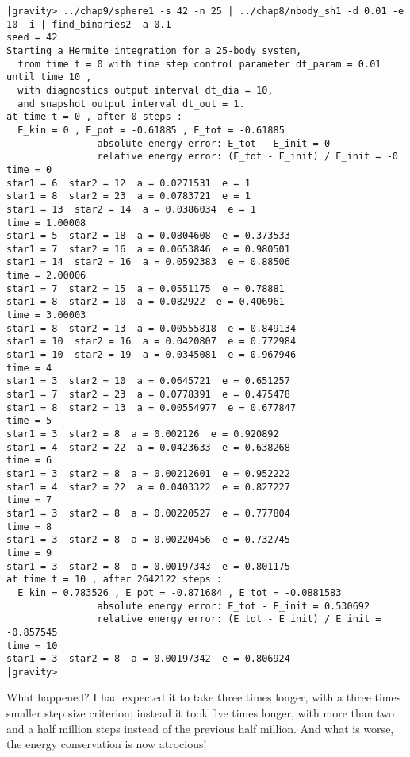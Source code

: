 \begin{small}
\begin{verbatim}
|gravity> ../chap9/sphere1 -s 42 -n 25 | ../chap8/nbody_sh1 -d 0.01 -e 10 -i | find_binaries2 -a 0.1
seed = 42
Starting a Hermite integration for a 25-body system,
  from time t = 0 with time step control parameter dt_param = 0.01  until time 10 ,
  with diagnostics output interval dt_dia = 10,
  and snapshot output interval dt_out = 1.
at time t = 0 , after 0 steps :
  E_kin = 0 , E_pot = -0.61885 , E_tot = -0.61885
                absolute energy error: E_tot - E_init = 0
                relative energy error: (E_tot - E_init) / E_init = -0
time = 0
star1 = 6  star2 = 12  a = 0.0271531  e = 1
star1 = 8  star2 = 23  a = 0.0783721  e = 1
star1 = 13  star2 = 14  a = 0.0386034  e = 1
time = 1.00008
star1 = 5  star2 = 18  a = 0.0804608  e = 0.373533
star1 = 7  star2 = 16  a = 0.0653846  e = 0.980501
star1 = 14  star2 = 16  a = 0.0592383  e = 0.88506
time = 2.00006
star1 = 7  star2 = 15  a = 0.0551175  e = 0.78881
star1 = 8  star2 = 10  a = 0.082922  e = 0.406961
time = 3.00003
star1 = 8  star2 = 13  a = 0.00555818  e = 0.849134
star1 = 10  star2 = 16  a = 0.0420807  e = 0.772984
star1 = 10  star2 = 19  a = 0.0345081  e = 0.967946
time = 4
star1 = 3  star2 = 10  a = 0.0645721  e = 0.651257
star1 = 7  star2 = 23  a = 0.0778391  e = 0.475478
star1 = 8  star2 = 13  a = 0.00554977  e = 0.677847
time = 5
star1 = 3  star2 = 8  a = 0.002126  e = 0.920892
star1 = 4  star2 = 22  a = 0.0423633  e = 0.638268
time = 6
star1 = 3  star2 = 8  a = 0.00212601  e = 0.952222
star1 = 4  star2 = 22  a = 0.0403322  e = 0.827227
time = 7
star1 = 3  star2 = 8  a = 0.00220527  e = 0.777804
time = 8
star1 = 3  star2 = 8  a = 0.00220456  e = 0.732745
time = 9
star1 = 3  star2 = 8  a = 0.00197343  e = 0.801175
at time t = 10 , after 2642122 steps :
  E_kin = 0.783526 , E_pot = -0.871684 , E_tot = -0.0881583
                absolute energy error: E_tot - E_init = 0.530692
                relative energy error: (E_tot - E_init) / E_init = -0.857545
time = 10
star1 = 3  star2 = 8  a = 0.00197342  e = 0.806924
|gravity> 
\end{verbatim}
\end{small}

\abc

\bob
What happened?  I had expected it to take three times longer, with a
three times smaller step size criterion; instead it took five times
longer, with more than two and a half million steps instead of the
previous half million.  And what is worse, the energy conservation is
now atrocious!

